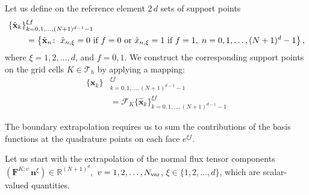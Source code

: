 \documentclass{scrreprt}
\theoremstyle{definition}
\theoremstyle{nonumberplain}
\renewcommand{\vec}[1]{{\textbf{#1}}}
\newcommand{\tria}{\mathcal{T}_h}
\newcommand{\cell}{K}
\newcommand{\face}{e}
\newcommand{\refVec}[1]{\hat{\vec{#1}}}
\newcommand{\mapping}{\boldsymbol{\mathcal{F}}_{\cell}}
\begin{document}
Let us define on the reference element $2\,d$ sets of support points
\begin{align*}
\{\refVec{x}_{k}\}&_{k=0,1,\ldots,(N+1)^{d-1}-1}^{\xi f}
\\
&=
\left\{\refVec{x}_{n}\colon\; \hat{x}_{n,\xi}=0\textup{ if }f=0
\textup{ or } \hat{x}_{n,\xi}=1 \textup{ if }f=1,\;n=0,1,\ldots,(N+1)^{d}-1
\right\},
\end{align*}
where $\xi=1,2,\ldots,d$, and $f=0,1$.
We construct the corresponding support points on the grid cells $\cell\in\tria$
by applying a mapping:
\begin{align*}
\{\vec{x}_{k}\}&_{k=0,1,\ldots,(N+1)^{d-1}-1}^{\xi f}
\\
&=
\mapping
{\{\refVec{x}_{k}\}_{k=0,1,\ldots,(N+1)^{d-1}-1}^{\xi f}}
\end{align*}

The boundary extrapolation requires us to sum the contributions of the basis
functions at the quadrature points on each face $\face^{\xi f}$.

Let us start with the extrapolation of the
normal flux tensor components
$
(\vec{F}^{\cell;v}\,\vec{n}^{\xi})\in\mathbb{R}^{(N+1)^{d}},
$
$v=1,2,\ldots,N_\textup{var}$,
$\xi\in\{1,2,\ldots,d\}$,
which are scalar-valued quantities.
\end{document}
